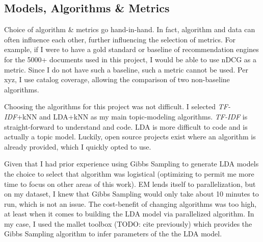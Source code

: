 \subsection{Models, Algorithms \& Metrics}
Choice of algorithm \& metrics go hand-in-hand. In fact, algorithm and data can often influence each other, further influencing the selection of metrics. For example, if I were to have a gold standard or baseline of recommendation engines for the 5000+ documents used in this project, I would be able to use nDCG as a metric. Since I do not have such a baseline, such a metric cannot be used. Per xyz, I use catalog coverage, allowing the comparison of two non-baseline algorithms.

Choosing the algorithms for this project was not difficult. I selected \emph{TF-IDF}+kNN and LDA+kNN as my main topic-modeling algorithms. \emph{TF-IDF} is straight-forward to understand and code. LDA is more difficult to code and is actually a topic model. Luckily, open source projects exist where an algorithm is already provided, which I quickly opted to use.

Given that I had prior experience using Gibbs Sampling to generate LDA models \citep{bean5-LDA-ToT} the choice to select that algorithm was logistical (optimizing to permit me more time to focus on other areas of this work). EM lends itself to parallelization, but on my dataset, I knew that Gibbs Sampling would only take about 10 minutes to run, which is not an issue. The cost-benefit of changing algorithms was too high, at least when it comes to building the LDA model via parallelized algorithm. In my case, I used the mallet toolbox \citep{McCallumMALLET} (TODO: cite previously) which provides the Gibbs Sampling algorithm to infer parameters of the the LDA model.


